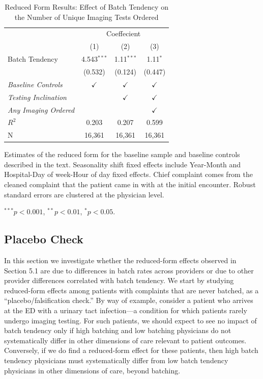 \documentclass[,,nonblindrev]{informs}
\begin{document}
\begin{table}[!htbp] \centering 
  \caption{Reduced Form Results: Effect of Batch Tendency on the Number of Unique Imaging Tests Ordered}
  \label{table:reduced_form}
  \begin{tabularx}{5.5in}{Xccc} %
  \toprule
   & \multicolumn{3}{c}{Coeffecient} \\
  \cmidrule{2-4}
   & (1) & (2) & (3) \\
  \midrule
  Batch Tendency  & 4.543$^{***}$ & 1.11$^{***}$ & 1.11$^{*}$ \\ 
   & (0.532) & (0.124) & (0.447) \\
  \textit{Baseline Controls} &  $\checkmark$ & $\checkmark$ & $\checkmark$ \\ 
  \textit{Testing Inclination}  & & $\checkmark$ & $\checkmark$ \\
  \textit{Any Imaging Ordered} & & & $\checkmark$ \\ %
  \midrule
  $R^2$ & 0.203 & 0.207 & 0.599 \\ 
  N & 16,361 & 16,361 & 16,361 \\ 
  \bottomrule
  \end{tabularx}
  \begin{tablenotes}
  \small
  \item Estimates of the reduced form for the baseline sample and baseline controls described in the text. Seasonality shift fixed effects include Year-Month and Hospital-Day of week-Hour of day fixed effects. Chief complaint comes from the cleaned complaint that the patient came in with at the initial encounter. Robust standard errors are clustered at the physician level.
  \item $^{***} p < 0.001$, $^{**} p < 0.01$, $^{*} p < 0.05$.
  \end{tablenotes}
\end{table}

\hypertarget{placebo-check}{%
\subsection{Placebo Check}\label{placebo-check}}

In this section we investigate whether the reduced-form effects observed
in Section 5.1 are due to differences in batch rates across providers or
due to other provider differences correlated with batch tendency. We
start by studying reduced-form effects among patients with complaints
that are never batched, as a ``placebo/falsification check.'' By way of
example, consider a patient who arrives at the ED with a urinary tact
infection---a condition for which patients rarely undergo imaging
testing. For such patients, we should expect to see no impact of batch
tendency only if high batching and low batching physicians do not
systematically differ in other dimensions of care relevant to patient
outcomes. Conversely, if we do find a reduced-form effect for these
patients, then high batch tendency physicians must systematically differ
from low batch tendency physicians in other dimensions of care, beyond
batching.
\end{document}

